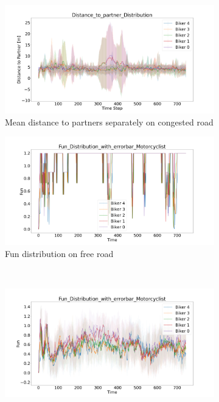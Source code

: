 \begin{figure}[H]
	\centering
	\begin{subfigure}[b]{0.45\textwidth}
		\centering
		\includegraphics[width=1.0\textwidth]{images/Wildschapbachstrase/Wildschapbachstrase_Distance_to_partner_distribution_congested.png}
		\caption{Mean distance to partners separately on congested road}
	\end{subfigure}
	\hfill
	\begin{subfigure}[b]{0.45\textwidth}
		\centering
		\includegraphics[width=1.0\textwidth]{images/Wildschapbachstrase/Wildschapbachstrase_Fun_Distribution_with_errorbar_free.png}
		\caption{Fun distribution on free road}
	\end{subfigure}
	\\
	\begin{subfigure}[b]{0.45\textwidth}
		\centering
		\includegraphics[width=1.0\textwidth]{images/Wildschapbachstrase/Wildschapbachstrase_Fun_Distribution_with_errorbar_congested.png}

\end{subfigure}
\end{figure}
